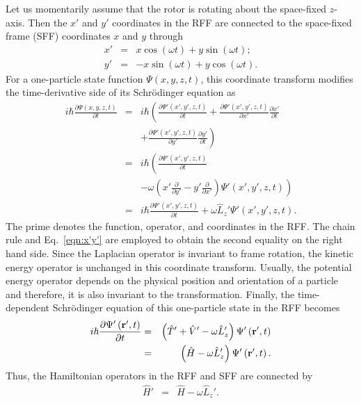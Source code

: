 \documentclass[12pt]{iopart}
\begin{document}
Let us momentarily assume that the rotor is rotating about the space-fixed $z$-axis. 
Then the $x'$ and $y'$ coordinates in the RFF are connected to the space-fixed frame (SFF) 
coordinates $x$ and $y$ through
\begin{eqnarray}
x'&=&x\cos \left( \omega t \right)+y\sin\left( \omega t \right); \nonumber \\
y'&=&-x\sin\left( \omega t \right)+y\cos\left( \omega t \right). \label{eqn:x'y'}
\end{eqnarray}
For a one-particle state function $\Psi\left(x,y,z,t\right)$, this coordinate transform modifies the time-derivative side of its Schr\"odinger equation as
\begin{eqnarray}
i\hbar\frac{\partial \Psi\left(x,y,z,t \right)}{\partial t}&=&i\hbar\left( \frac{\partial \Psi'\left(x',y',z,t \right)}{\partial t} + \frac{\partial \Psi'\left(x',y',z,t \right)}{\partial x'}\frac{\partial x'}{\partial t}\right.\nonumber\\
&&\left. +\frac{\partial \Psi'\left(x',y',z,t \right)}{\partial y'}\frac{\partial y'}{\partial t} \right) \nonumber\\
&=&i\hbar\left( \frac{\partial \Psi'\left(x',y',z,t \right)}{\partial t}\right. \nonumber\\
&&\left. -\omega \left( x'\frac{\partial}{\partial y'} -y'\frac{\partial}{\partial x'}\right)\Psi'\left(x',y',z,t \right) \right) \nonumber\\
&=&i\hbar\frac{\partial \Psi'\left(x',y',z,t \right)}{\partial t} + \omega\hat{L}_z'\Psi'\left(x',y',z,t \right).
\end{eqnarray}
The prime denotes the function, operator, and coordinates in the RFF. 
The chain rule and Eq.~\ref{eqn:x'y'} are employed to obtain the second equality on the right hand side.
Since the Laplacian operator is invariant to frame rotation, the kinetic energy operator is unchanged in this coordinate transform. Usually, the potential energy operator depends on the physical position and orientation of a particle and therefore, it is also invariant to the transformation. Finally, the time-dependent Schr\"odinger equation of this one-particle state in the RFF becomes
\begin{eqnarray}
i\hbar\frac{\partial \Psi'\left( {\bf r}',t \right)}{\partial t}&=&\left(\hat{T}'+\hat{V}'-\omega\hat{L}_z'\right)\Psi'\left({\bf r}',t \right) \nonumber\\
&=&\left(\hat{H}-\omega\hat{L}_z' \right)\Psi'\left( {\bf r}',t \right).
\end{eqnarray}
Thus, the Hamiltonian operators in the RFF and SFF are connected by
\begin{eqnarray}
\hat{H}'&=&\hat{H}-\omega\hat{L}_z'.
\end{eqnarray}
\end{document}
